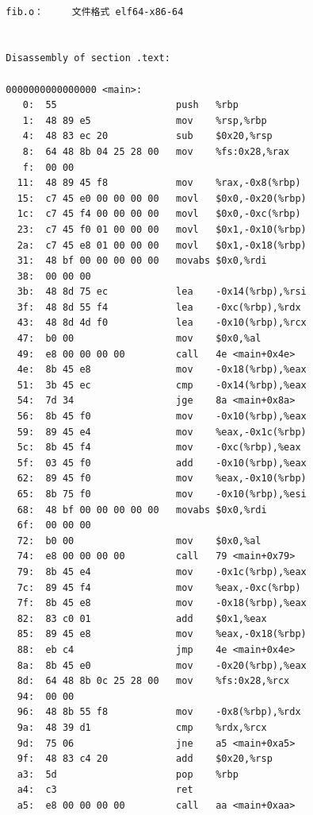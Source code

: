 \documentclass[UTF8,a4paper,10pt]{ctexart}
\begin{document}
\begin{verbatim}

  fib.o：     文件格式 elf64-x86-64


  Disassembly of section .text:
  
  0000000000000000 <main>:
     0:  55                     push   %rbp
     1:  48 89 e5               mov    %rsp,%rbp
     4:  48 83 ec 20            sub    $0x20,%rsp
     8:  64 48 8b 04 25 28 00   mov    %fs:0x28,%rax
     f:  00 00 
    11:  48 89 45 f8            mov    %rax,-0x8(%rbp)
    15:  c7 45 e0 00 00 00 00   movl   $0x0,-0x20(%rbp)
    1c:  c7 45 f4 00 00 00 00   movl   $0x0,-0xc(%rbp)
    23:  c7 45 f0 01 00 00 00   movl   $0x1,-0x10(%rbp)
    2a:  c7 45 e8 01 00 00 00   movl   $0x1,-0x18(%rbp)
    31:  48 bf 00 00 00 00 00   movabs $0x0,%rdi
    38:  00 00 00 
    3b:  48 8d 75 ec            lea    -0x14(%rbp),%rsi
    3f:  48 8d 55 f4            lea    -0xc(%rbp),%rdx
    43:  48 8d 4d f0            lea    -0x10(%rbp),%rcx
    47:  b0 00                  mov    $0x0,%al
    49:  e8 00 00 00 00         call   4e <main+0x4e>
    4e:  8b 45 e8               mov    -0x18(%rbp),%eax
    51:  3b 45 ec               cmp    -0x14(%rbp),%eax
    54:  7d 34                  jge    8a <main+0x8a>
    56:  8b 45 f0               mov    -0x10(%rbp),%eax
    59:  89 45 e4               mov    %eax,-0x1c(%rbp)
    5c:  8b 45 f4               mov    -0xc(%rbp),%eax
    5f:  03 45 f0               add    -0x10(%rbp),%eax
    62:  89 45 f0               mov    %eax,-0x10(%rbp)
    65:  8b 75 f0               mov    -0x10(%rbp),%esi
    68:  48 bf 00 00 00 00 00   movabs $0x0,%rdi
    6f:  00 00 00 
    72:  b0 00                  mov    $0x0,%al
    74:  e8 00 00 00 00         call   79 <main+0x79>
    79:  8b 45 e4               mov    -0x1c(%rbp),%eax
    7c:  89 45 f4               mov    %eax,-0xc(%rbp)
    7f:  8b 45 e8               mov    -0x18(%rbp),%eax
    82:  83 c0 01               add    $0x1,%eax
    85:  89 45 e8               mov    %eax,-0x18(%rbp)
    88:  eb c4                  jmp    4e <main+0x4e>
    8a:  8b 45 e0               mov    -0x20(%rbp),%eax
    8d:  64 48 8b 0c 25 28 00   mov    %fs:0x28,%rcx
    94:  00 00 
    96:  48 8b 55 f8            mov    -0x8(%rbp),%rdx
    9a:  48 39 d1               cmp    %rdx,%rcx
    9d:  75 06                  jne    a5 <main+0xa5>
    9f:  48 83 c4 20            add    $0x20,%rsp
    a3:  5d                     pop    %rbp
    a4:  c3                     ret
    a5:  e8 00 00 00 00         call   aa <main+0xaa>
  
\end{verbatim}
\end{document}
